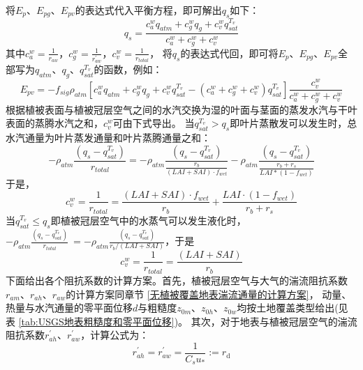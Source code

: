 将$E_p$、$E_{pg}$、$E_{pv}$的表达式代入平衡方程，即可解出$q_s$如下：
\begin{equation}
q_{s}=\frac{c_{a}^{w} q_{atm}+c_{g}^{w} q_{g}+c_{v}^{w} q_{s a t}^{T_{v}}}{c_{a}^{w}+c_{g}^{w}+c_{v}^{w}}
\end{equation}
其中$c_a^w=\frac{1}{r_{aw}}$，$c_g^w=\frac{1}{r_{aw}^\prime}$，$c_v^w=\frac{1}{r_{total}}$，
将$q_s$的表达式代回，即可将$E_p$、$E_{pg}$、$E_{pv}$全部写为$q_{atm}$、$q_g$、$q_{sat}^{T_v}$的函数，例如：
\begin{equation}
E_{p v}=-f_{sig} \rho_{atm}\left[c_{a}^{w} q_{atm}+c_{g}^{w} q_{g}+c_{v}^{w} q_{s a t}^{T_{v}}-
\left(c_{a}^{w}+c_{g}^{w}+c_{v}^{w}\right) q_{s a t}^{T_{v}}\right] \frac{c_{v}^{w}}{c_{a}^{w}+c_{g}^{w}+c_{v}^{w}}
\end{equation}
根据植被表面与植被冠层空气之间的水汽交换为湿的叶面与茎面的蒸发水汽与干叶表面的蒸腾水汽之和，$c_v^w$可由下式导出。
当$q_{sat}^{T_v}>q_s$即叶片蒸散发可以发生时，总水汽通量为叶片蒸发通量和叶片蒸腾通量之和：
\begin{equation}
-\rho_{atm} \frac{\left(q_{s}-q_{s a t}^{T_{v}}\right)}{r_{{total }}}=-\rho_{atm} 
\frac{\left(q_{s}-q_{s a t}^{T_{v}}\right)}{\frac{r_{b}}{(LAI+S A I) \cdot f_{{wet }}}}-\rho_{atm} \frac{\left(q_{s}-q_{s a t}^{T_{v}}\right)}{\frac{r_{b}+r_{s}}{LAI *\left(1-f_{{wet }}\right)}}
\end{equation}
于是，
\begin{equation}
c_{v}^{w}=\frac{1}{r_{{total }}}=\frac{(LAI+SAI) \cdot f_{{wet }}}{r_{b}}+\frac{LAI \cdot \left(1-f_{{wet}}\right)}{r_{b}+r_{s}}
\end{equation}
当$q_{sat}^{T_v}\le q_s$即植被冠层空气中的水蒸气可以发生液化时，
$-\rho_{atm}\frac{\left(q_s-q_{sat}^{T_v}\right)}{r_{total}}\ =-\rho_{atm}\frac{\left(q_s-q_{sat}^{T_v}\right)}{r_b/\left(LAI+SAI\right)}$，于是
\begin{equation}
c_{v}^{w}=\frac{1}{r_{{total }}}=\frac{(LAI+SAI)}{r_{b}}
\end{equation}
下面给出各个阻抗系数的计算方案。首先，植被冠层空气与大气的湍流阻抗系数$r_{am}$、$r_{ah}$、$r_{aw}$的计算方案同章节 \ref{无植被覆盖地表湍流通量的计算方案}，
动量、热量与水汽通量的零平面位移$d$与粗糙度$z_{0m}$、$z_{0h}$、$z_{0w}$均按土地覆盖类型给出(见
表 \ref{tab:USGS地表粗糙度和零平面位移})。
其次，对于地表与植被冠层空气的湍流阻抗系数$r_{ah}^\prime$、$r_{aw}^\prime$，计算公式为：
\begin{equation}
r_{a h}^{\prime}=r_{a w}^{\prime}=\frac{1}{C_{s} u_{*}}:=r_{\mathrm{d}}
\end{equation}
